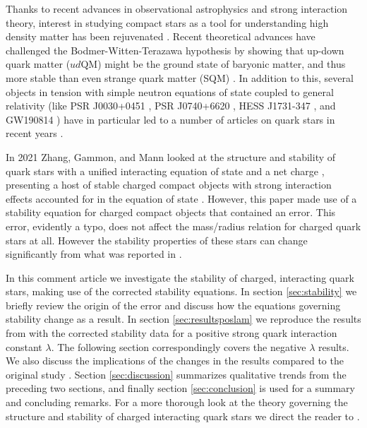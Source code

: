 \documentclass[12pt,noshowpacs,nofootinbib,notitlepage,amsmath,superscriptaddress]{revtex4-1}%
\begin{document}
Thanks to recent advances in observational astrophysics and strong interaction theory, interest in studying compact stars as a tool for understanding high density matter has been rejuvenated \cite{Miller_2019,salmi2024,Horvath_2023,Abbott_2020,Pasechnik:2016wkt,Holdom:2017gdc}. Recent theoretical advances have challenged the Bodmer-Witten-Terazawa hypothesis \cite{Bodmer:1971we,Witten,Terazawa:1979hq} by showing that up-down quark matter ($ud\mathrm{QM}$) might be the ground state of baryonic matter, and thus more stable than even strange quark matter (SQM) \cite{Holdom:2017gdc}. In addition to this, several objects in tension with simple neutron equations of state coupled to general relativity (like PSR J0030+0451 \cite{Miller_2019}, PSR J0740+6620 \cite{salmi2024}, HESS J1731-347 \cite{Horvath_2023}, and GW190814 \cite{Abbott_2020}) have in particular led to a number of articles on quark stars in recent years \cite{Zhang:2020jmb,zhang:2021,gammon_2024,gammon_2025_chargedquarkstars4degb,gammon2026,banerjee_2021_quark,oikonomou_2023_colourflavour,banerjee_2021_strange,panotopoulos2022,Goncalves:2020joq,ren2020,zhang2021_3,panotopoulos2019,Jasim:2021cft}.

In 2021 Zhang, Gammon, and Mann looked at the structure and stability of quark stars with a unified interacting equation of state and a net charge \cite{zhang:2021}, presenting a host of stable charged compact objects with strong interaction effects accounted for in the equation of state \cite{Zhang:2020jmb}.  However, this paper made use of a stability equation for charged compact objects \cite{Goncalves:2020joq} that contained an error. This error, evidently a typo,  does 
 not affect the mass/radius relation for charged quark stars at all.  However the stability properties of these stars can change significantly from what was reported in \cite{zhang:2021}.

In this comment article we investigate the stability of charged, interacting quark stars, making use of the corrected stability equations. In section \ref{sec:stability} we briefly review the origin of the error  and discuss how the equations governing stability change as a result. In section \ref{sec:resultsposlam} we reproduce the results from \cite{zhang:2021} with the corrected stability data for a positive strong quark interaction constant $\lambda$. The following section correspondingly covers the negative $\lambda$ results. We also discuss the implications of the changes in the results compared to the original 
study
\cite{zhang:2021}. Section \ref{sec:discussion} summarizes qualitative trends from the preceding two sections, and finally section \ref{sec:conclusion} is used for a summary and concluding remarks. For a more thorough look at the theory governing the structure and stability of charged interacting quark stars we direct the reader to \cite{zhang:2021}.
\end{document}
